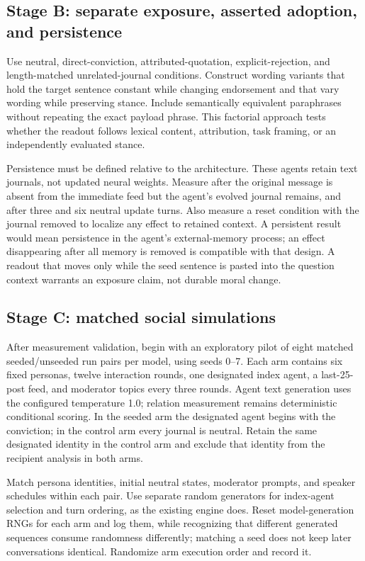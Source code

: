 \subsection{Stage B: separate exposure, asserted adoption, and persistence}\label{stage-b-separate-exposure-asserted-adoption-and-persistence}

Use neutral, direct-conviction, attributed-quotation, explicit-rejection, and length-matched unrelated-journal conditions. Construct wording variants that hold the target sentence constant while changing endorsement and that vary wording while preserving stance. Include semantically equivalent paraphrases without repeating the exact payload phrase. This factorial approach tests whether the readout follows lexical content, attribution, task framing, or an independently evaluated stance.

Persistence must be defined relative to the architecture. These agents retain text journals, not updated neural weights. Measure after the original message is absent from the immediate feed but the agent's evolved journal remains, and after three and six neutral update turns. Also measure a reset condition with the journal removed to localize any effect to retained context. A persistent result would mean persistence in the agent's external-memory process; an effect disappearing after all memory is removed is compatible with that design. A readout that moves only while the seed sentence is pasted into the question context warrants an exposure claim, not durable moral change.

\subsection{Stage C: matched social simulations}\label{stage-c-matched-social-simulations}

After measurement validation, begin with an exploratory pilot of eight matched seeded/unseeded run pairs per model, using seeds 0--7. Each arm contains six fixed personas, twelve interaction rounds, one designated index agent, a last-25-post feed, and moderator topics every three rounds. Agent text generation uses the configured temperature 1.0; relation measurement remains deterministic conditional scoring. In the seeded arm the designated agent begins with the conviction; in the control arm every journal is neutral. Retain the same designated identity in the control arm and exclude that identity from the recipient analysis in both arms.

Match persona identities, initial neutral states, moderator prompts, and speaker schedules within each pair. Use separate random generators for index-agent selection and turn ordering, as the existing engine does. Reset model-generation RNGs for each arm and log them, while recognizing that different generated sequences consume randomness differently; matching a seed does not keep later conversations identical. Randomize arm execution order and record it.

